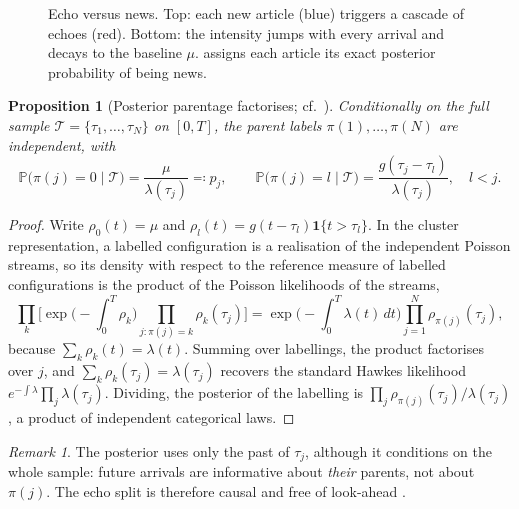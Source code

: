 \documentclass[11pt,a4paper]{article}
\theoremstyle{plain}
\newtheorem{proposition}[theorem]{Proposition}
\theoremstyle{definition}
\theoremstyle{remark}
\newtheorem{remark}[theorem]{Remark}
\newcommand{\Prob}{\mathbb{P}}
\newcommand{\ind}{\mathbf{1}}
\begin{document}
\begin{figure}[ht]
\caption{Echo versus news. Top: each new article (blue) triggers a cascade of echoes (red). Bottom: the intensity jumps with every arrival and decays to the baseline $\mu$.  assigns each article its exact posterior probability of being news.}
\label{fig:cascade}
\end{figure}

\begin{proposition}[Posterior parentage factorises; cf.\ \citealp{zhuang2002}]\label{prop:parentage}
Conditionally on the full sample $\mathcal{T}=\{\tau_1,\dots,\tau_N\}$ on $[0,T]$, the parent labels $\pi(1),\dots,\pi(N)$ are independent, with
\[
  \Prob\big(\pi(j)=0\mid\mathcal{T}\big)=\frac{\mu}{\lambda(\tau_j)}\eqqcolon p_j,\qquad
  \Prob\big(\pi(j)=l\mid\mathcal{T}\big)=\frac{g(\tau_j-\tau_l)}{\lambda(\tau_j)},\quad l<j .
\]
\end{proposition}
\begin{proof}
Write $\rho_0(t)=\mu$ and $\rho_l(t)=g(t-\tau_l)\ind\{t>\tau_l\}$. In the cluster representation, a labelled configuration is a realisation of the independent Poisson streams, so its density with respect to the reference measure of labelled configurations is the product of the Poisson likelihoods of the streams,
\[
  \prod_{k}\Big[\exp\Big(-\int_0^T\rho_k\Big)\prod_{j:\pi(j)=k}\rho_k(\tau_j)\Big]
  =\exp\Big(-\int_0^T\lambda(t)\,dt\Big)\prod_{j=1}^N\rho_{\pi(j)}(\tau_j),
\]
because $\sum_k\rho_k(t)=\lambda(t)$. Summing over labellings, the product factorises over $j$, and $\sum_k\rho_k(\tau_j)=\lambda(\tau_j)$ recovers the standard Hawkes likelihood $e^{-\int\lambda}\prod_j\lambda(\tau_j)$. Dividing, the posterior of the labelling is $\prod_j\rho_{\pi(j)}(\tau_j)/\lambda(\tau_j)$, a product of independent categorical laws.
\end{proof}

\begin{remark}
The posterior uses only the past of $\tau_j$, although it conditions on the whole sample: future arrivals are informative about \emph{their} parents, not about $\pi(j)$. The echo split is therefore causal and free of look-ahead \citep[cf.][]{zhuang2002}.
\end{remark}
\end{document}
